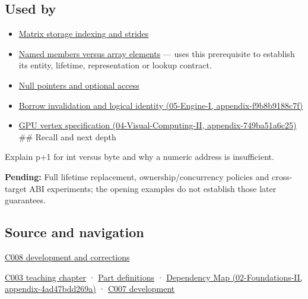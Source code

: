 \subsection{Used by}\label{used-by}

\begin{itemize}
\item
  \hyperref[appendix-ffdc1d4e5350]{Matrix storage indexing and strides}
\item
  \hyperref[appendix-3f7e15effba6]{Named members versus array elements} --- uses this prerequisite to establish its entity, lifetime, representation or lookup contract.
\item
  \hyperref[appendix-afae48c31800]{Null pointers and optional access}
\item
  \href{}{Borrow invalidation and logical identity (05-Engine-I, appendix-f9b8b9188c7f)}
\item
  \href{}{GPU vertex specification (04-Visual-Computing-II, appendix-749ba51a6c25)} \#\# Recall and next depth
\end{itemize}

Explain p+1 for int versus byte and why a numeric address is insufficient.

\textbf{Pending:} Full lifetime replacement, ownership/concurrency policies and cross-target ABI experiments; the opening examples do not establish those later guarantees.

\subsection{Source and navigation}\label{source-and-navigation}

\hyperref[appendix-fd090d982a15]{C008 development and corrections}

\href{Continuous\%20Notes/Computing\%20Foundations\%20-\%20From\%20Bits\%20to\%20C++\%20and\%20Systems\%20APIs\#Where\%20the\%20bytes\%20live}{C003 teaching chapter} · \hyperref[appendix-fd090d982a15]{Part definitions} · \href{}{Dependency Map (02-Foundations-II, appendix-4ad47bdd269a)} · \href{Continuous\%20Notes/Computing\%20Foundations\%20-\%20From\%20Bits\%20to\%20C++\%20and\%20Systems\%20APIs\#Bringing\%20the\%20object\%20model\%20back\%20to\%20bytes}{C007 development}
